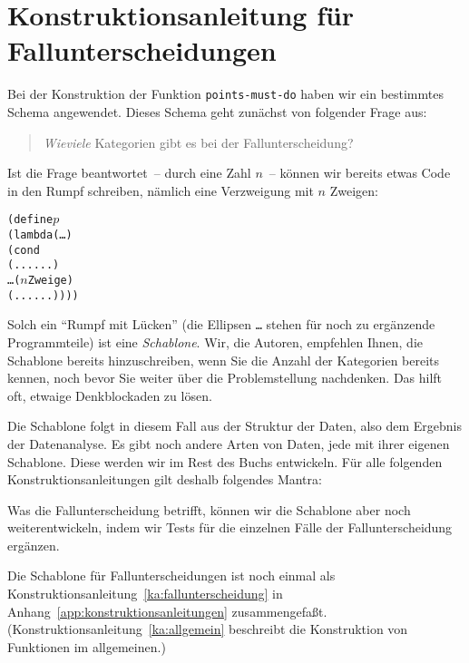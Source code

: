 \begin{mantra}\label{mantra:coverage}
  
\end{mantra}

\section{Konstruktionsanleitung für Fallunterscheidungen}

Bei der Konstruktion der Funktion \texttt{points-must-do} haben wir
ein bestimmtes Schema angewendet.  Dieses Schema geht zunächst von folgender
Frage aus:
%
\begin{quote}
  \emph{Wieviele} Kategorien gibt es bei der Fallunterscheidung?
\end{quote}
%
Ist die Frage beantwortet~-- durch eine Zahl $n$~-- können wir bereits
etwas Code in den Rumpf schreiben, nämlich eine Verzweigung mit $n$
Zweigen:
%
\begin{alltt}
(define \(p\)
  (lambda (\ldots)
    (cond
      (... ...)
      \ldots{}\hspace{1in}\textrm{(\(n\) Zweige)}
      (... ...))))
\end{alltt}
%
Solch ein "`Rumpf mit Lücken"' (die Ellipsen
\texttt{\ldots} stehen für noch zu ergänzende Programmteile) ist eine
\textit{Schablone}.  Wir, die Autoren, empfehlen
Ihnen, die Schablone bereits hinzuschreiben, wenn Sie die Anzahl der
Kategorien bereits kennen, noch bevor Sie weiter über die
Problemstellung nachdenken.  Das hilft oft, etwaige Denkblockaden zu
lösen.

Die Schablone folgt in diesem Fall aus der Struktur der Daten, also
dem Ergebnis der Datenanalyse.  Es gibt noch andere Arten von Daten,
jede mit ihrer eigenen Schablone.  Diese werden wir im Rest des Buchs
entwickeln.
Für alle folgenden Konstruktionsanleitungen gilt deshalb folgendes Mantra:

\begin{mantra}[Schablone]\label{mantra:data-analysis}
  
\end{mantra}

Was die Fallunterscheidung betrifft, können wir die Schablone aber
noch weiterentwickeln, indem wir Tests für die einzelnen Fälle der
Fallunterscheidung ergänzen.

Die Schablone für Fallunterscheidungen ist noch einmal
als Konstruktionsanleitung~\ref{ka:fallunterscheidung} in
Anhang~\ref{app:konstruktionsanleitungen} zusammengefaßt.
(Konstruktionsanleitung~\ref{ka:allgemein} beschreibt die Konstruktion
von Funktionen im allgemeinen.)

